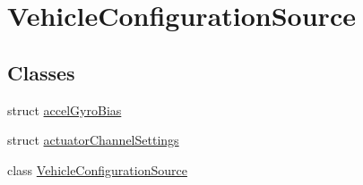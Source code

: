 \hypertarget{group___vehicle_configuration_source}{\section{Vehicle\-Configuration\-Source}
\label{group___vehicle_configuration_source}
}
\subsection*{Classes}
\begin{DoxyCompactItemize}
\item 
struct \hyperlink{structaccel_gyro_bias}{accel\-Gyro\-Bias}
\item 
struct \hyperlink{structactuator_channel_settings}{actuator\-Channel\-Settings}
\item 
class \hyperlink{class_vehicle_configuration_source}{Vehicle\-Configuration\-Source}
\end{DoxyCompactItemize}
